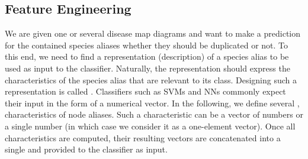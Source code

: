 \documentclass[
	fontsize=10pt, %
	twoside=false, %
	secnumdepth=1, %
  toc=indentunnumbered %
]{kaobook}
\begin{document}

\subsection{Feature Engineering}
\label{sec:feature-selection}

We are given one or several disease map diagrams and want to make a prediction
for the contained species aliases whether they should be duplicated or not. To
this end, we need to find a representation (description) of a species alias to
be used as input to the classifier. Naturally, the representation should express
the characteristics of the species alias that are relevant to its class.
Designing such a representation is called .
Classifiers such as SVMs and NNs commonly expect their input in the form of a
numerical vector.
%
In the following, we define several , \ie characteristics of node
aliases. Such a characteristic can be a vector of numbers or a single number (in
which case we consider it as a one-element vector). Once all characteristics are
computed, their resulting vectors are concatenated into a single  and provided to the classifier as input.
\end{document}
